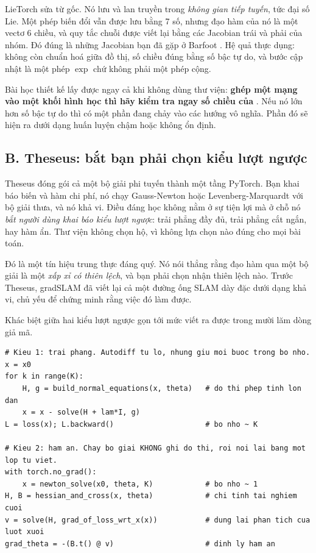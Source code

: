\documentclass[../../deep_learning.tex]{subfiles}
\begin{document}
LieTorch \cite{teed2021lietorch} sửa từ gốc. Nó lưu và lan truyền  trong \emph{không gian tiếp tuyến}, tức đại số Lie. Một phép biến đổi vẫn được lưu bằng 7 số, nhưng đạo hàm của nó là một vectơ 6 chiều, và quy tắc chuỗi được viết lại bằng các Jacobian trái và phải của nhóm. Đó đúng là những Jacobian bạn đã gặp ở Barfoot \cite{barfoot2017}. Hệ quả thực dụng: không còn chuẩn hoá giữa đồ thị, số chiều  đúng bằng số bậc tự do, và bước cập nhật là một phép \(\exp\) chứ không phải một phép cộng.

Bài học thiết kế lấy được ngay cả khi không dùng thư viện: \textbf{ghép một mạng vào một khối hình học thì hãy kiểm tra ngay số chiều của }. Nếu nó lớn hơn số bậc tự do thì có một phần  đang chảy vào các hướng vô nghĩa. Phần đó sẽ hiện ra dưới dạng huấn luyện chậm hoặc không ổn định.

\subsection{B. Theseus: bắt bạn phải chọn kiểu lượt ngược}
Theseus \cite{pineda2022theseus} đóng gói cả một bộ giải phi tuyến thành một tầng PyTorch. Bạn khai báo biến và hàm chi phí, nó chạy Gauss-Newton hoặc Levenberg-Marquardt với bộ giải thưa, và nó khả vi. Điều đáng học không nằm ở sự tiện lợi mà ở chỗ nó \emph{bắt người dùng khai báo kiểu lượt ngược}: trải phẳng đầy đủ, trải phẳng cắt ngắn, hay hàm ẩn. Thư viện không chọn hộ, vì không lựa chọn nào đúng cho mọi bài toán.

Đó là một tín hiệu trung thực đáng quý. Nó nói thẳng rằng đạo hàm qua một bộ giải là một \emph{xấp xỉ có thiên lệch}, và bạn phải chọn nhận thiên lệch nào. Trước Theseus, gradSLAM \cite{jatavallabhula2020gradslam} đã viết lại cả một đường ống SLAM dày đặc dưới dạng khả vi, chủ yếu để chứng minh rằng việc đó làm được.

Khác biệt giữa hai kiểu lượt ngược gọn tới mức viết ra được trong mười lăm dòng giả mã.

\begin{lstlisting}[style=py]
# Kieu 1: trai phang. Autodiff tu lo, nhung giu moi buoc trong bo nho.
x = x0
for k in range(K):
    H, g = build_normal_equations(x, theta)   # do thi phep tinh lon dan
    x = x - solve(H + lam*I, g)
L = loss(x); L.backward()                     # bo nho ~ K

# Kieu 2: ham an. Chay bo giai KHONG ghi do thi, roi noi lai bang mot lop tu viet.
with torch.no_grad():
    x = newton_solve(x0, theta, K)            # bo nho ~ 1
H, B = hessian_and_cross(x, theta)            # chi tinh tai nghiem cuoi
v = solve(H, grad_of_loss_wrt_x(x))           # dung lai phan tich cua luot xuoi
grad_theta = -(B.t() @ v)                     # dinh ly ham an
\end{lstlisting}
\end{document}
